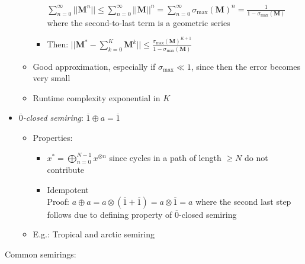 \begin{itemize}
\begin{itemize}
\begin{itemize}
            $
            \sum_{n=0}^\infty || \boldsymbol{M}^n || \leq \sum_{n=0}^\infty || \boldsymbol{M} ||^n = \sum_{n=0}^\infty \sigma_{\max}(\boldsymbol{M})^n = \frac{1}{1 - \sigma_{\max}(\boldsymbol{M})}
            $ where the second-to-last term is a geometric series
            \item Then: $
            || \boldsymbol{M}^* - \sum_{k=0}^K \boldsymbol{M}^k || \leq \frac{\sigma_{\max}(\boldsymbol{M})^{K+1}}{1 - \sigma_{\max}(\boldsymbol{M})}
            $
        \end{itemize}
        \item Good approximation, especially if $\sigma_{\max} \ll 1$, since then the error becomes very small
        \item Runtime complexity exponential in $K$
    \end{itemize}
    \item \emph{$\overline{0}$-closed semiring}: $\overline{1} \oplus a = \overline{1}$
    \begin{itemize}
        \item Properties:
        \begin{itemize}
            \item $
            x^* = \bigoplus_{n=0}^{N-1} x^{\otimes n}$ since cycles in a path of length $\geq N$ do not contribute 
            \item Idempotent\\
            Proof:
            $a \oplus a = a \otimes (\overline{1} + \overline{1}) = a \otimes \overline{1} = a$ where the second last step follows due to defining property of $\overline{0}$-closed semiring 
        \end{itemize}
        \item E.g.: Tropical and arctic semiring
    \end{itemize}
\end{itemize}
Common semirings:

